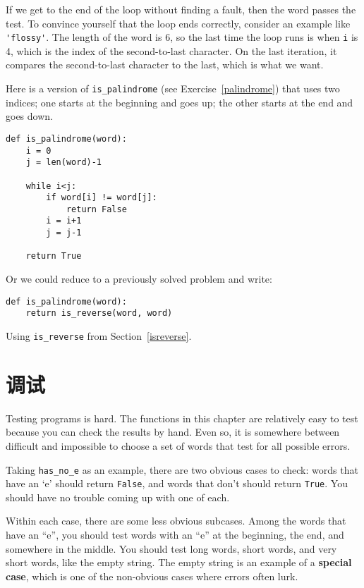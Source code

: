 \documentclass[10pt]{book}
\begin{document}
If we get to the end of the loop without finding a fault, then the
word passes the test.  To convince yourself that the loop ends
correctly, consider an example like \verb"'flossy'".  The
length of the word is 6, so
the last time the loop runs is when {\tt i} is 4, which is the
index of the second-to-last character.  On the last iteration,
it compares the second-to-last character to the last, which is
what we want.

Here is a version of \verb"is_palindrome" (see
Exercise~\ref{palindrome}) that uses two indices; one starts at the
beginning and goes up; the other starts at the end and goes down.

\begin{verbatim}
def is_palindrome(word):
    i = 0
    j = len(word)-1

    while i<j:
        if word[i] != word[j]:
            return False
        i = i+1
        j = j-1

    return True
\end{verbatim}

Or we could reduce to a previously solved
problem and write:

\begin{verbatim}
def is_palindrome(word):
    return is_reverse(word, word)
\end{verbatim}
%
Using \verb"is_reverse" from Section~\ref{isreverse}.


\section{调试}

Testing programs is hard.  The functions in this chapter are
relatively easy to test because you can check the results by hand.
Even so, it is somewhere between difficult and impossible to choose a
set of words that test for all possible errors.

Taking \verb"has_no_e" as an example, there are two obvious
cases to check: words that have an `e' should return {\tt False}, and
words that don't should return {\tt True}.  You should have no
trouble coming up with one of each.

Within each case, there are some less obvious subcases.  Among the
words that have an ``e'', you should test words with an ``e'' at the
beginning, the end, and somewhere in the middle.  You should test long
words, short words, and very short words, like the empty string.  The
empty string is an example of a {\bf special case}, which is one of
the non-obvious cases where errors often lurk.
\end{document}
